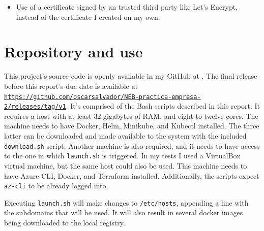\documentclass[11pt]{article}
\begin{document}
\begin{flushleft}
\begin{itemize}
        \item Use of a certificate signed by an trusted third party like Let's Encrypt, instead of the certificate I created on my own.

        
        
    \end{itemize}






    



\clearpage
\appendix
\section{Repository and use}
\label{anexo:grafico}
This project's source code is openly available in my GitHub at \cite{misgit2}. The final release before this report's due date is available at \texttt{\url{https://github.com/oscarsalvador/NEB-practica-empresa-2/releases/tag/v1}}. It's comprised of the Bash scripts described in this report. It requires a host with at least 32 gigabytes of RAM, and eight to twelve cores. The machine needs to have Docker, Helm, Minikube, and Kubectl installed. The three latter can be downloaded and made available to the system with the included \texttt{download.sh} script. Another machine is also required, and it needs to have access to the one in which \texttt{launch.sh} is triggered. In my tests I used a VirtualBox virtual machine, but the same host could also be used. This machine needs to have Azure CLI, Docker, and Terraform installed. Additionally, the scripts expect \texttt{az-cli} to be already logged into.
\linebreak

Executing \texttt{launch.sh} will make changes to \texttt{/etc/hosts}, appending a line with the subdomains that will be used. It will also result in several docker images being downloaded to the local registry.





\end{flushleft}

\clearpage
\printbibliography[heading=bibintoc]
\end{document}
